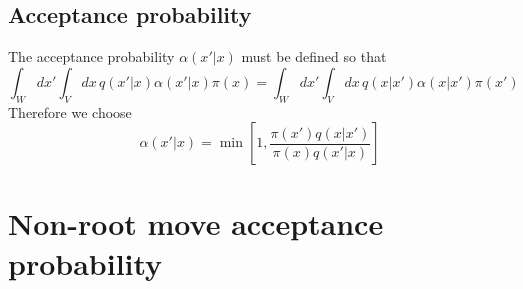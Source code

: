 \documentclass[a4paper, 11pt]{article}
\begin{document}
\subsection{Acceptance probability}

The acceptance probability $\alpha(x'|x)$ must be defined so that
\begin{equation}
  \int_Wdx'\int_Vdx\,q(x'|x)\alpha(x'|x)\pi(x)=\int_Wdx'\int_Vdx\,q(x|x')\alpha(x|x')\pi(x')
\end{equation}
Therefore we choose
\begin{equation}
  \alpha(x'|x)=\min\left[1,\frac{\pi(x')q(x|x')}{\pi(x)q(x'|x)}\right]
\end{equation}

\section{Non-root move acceptance probability}
\end{document}
